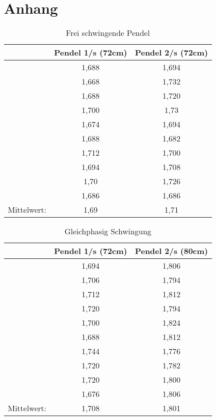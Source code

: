 \section{Anhang}
\label{sec:daten}

\begin{table}
    \centering
    \label{tab:Data_freischwingend}
    \caption{Frei schwingende Pendel}
    \begin{tabular}{c c | c}
        \toprule
         & Pendel 1\;/\;s (72cm) & Pendel 2\;/\;s (72cm)\\
        \midrule
        & 1,688 & 1,694 \\
        & 1,668 & 1,732 \\
        & 1,688 & 1,720  \\
        & 1,700  & 1,73  \\
        & 1,674 & 1,694 \\
        & 1,688 & 1,682 \\
        & 1,712 & 1,700   \\
        & 1,694 & 1,708 \\
        & 1,70  & 1,726 \\
        & 1,686 & 1,686 \\
        \midrule
        Mittelwert: & 1,69 & 1,71 \\
        \bottomrule
    \end{tabular} 
\end{table}

\begin{table}
    \centering
    \label{tab:Data_gleichphasig}
    \caption{Gleichphasig Schwingung}
    \begin{tabular}{c c | c}
        \toprule
        & Pendel 1\;/\;s (72cm) & Pendel 2\;/\;s (80cm)\\
        \midrule
            & 1,694 & 1,806 \\
            & 1,706 & 1,794 \\
            & 1,712 & 1,812 \\
            & 1,720 & 1,794 \\
            & 1,700 & 1,824 \\
            & 1,688 & 1,812 \\
            & 1,744 & 1,776 \\
            & 1,720 & 1,782 \\
            & 1,720 & 1,800 \\
            & 1,676 & 1,806 \\        
        \midrule
        Mittelwert: & 1,708 & 1,801 \\
        \bottomrule
    \end{tabular}
\end{table}




